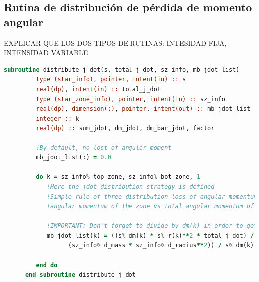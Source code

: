 \subsection{Rutina de distribución de pérdida de momento angular}
EXPLICAR QUE LOS DOS TIPOS DE RUTINAS: INTESIDAD FIJA, INTENSIDAD VARIABLE
\begin{lstlisting}[language=Fortran, caption={Rutina de distribución de pérdida de momento angular.}, label={lst:dis_jdot}]
      subroutine distribute_j_dot(s, total_j_dot, sz_info, mb_jdot_list)
         type (star_info), pointer, intent(in) :: s
         real(dp), intent(in) :: total_j_dot
         type (star_zone_info), pointer, intent(in) :: sz_info
         real(dp), dimension(:), pointer, intent(out) :: mb_jdot_list
         integer :: k
         real(dp) :: sum_jdot, dm_jdot, dm_bar_jdot, factor

         !By default, no lost of angular moment
         mb_jdot_list(:) = 0.0
      
         do k = sz_info% top_zone, sz_info% bot_zone, 1
            !Here the jdot distribution strategy is defined
            !Simple rule of three distribution loss of angular momentum based on the 
            !angular momentum of the zone vs total angular momentum of the convective zone

            !IMPORTANT: Don't forget to divide by dm(k) in order to get an "specific" jdot
            mb_jdot_list(k) = ((s% dm(k) * s% r(k)**2 * total_j_dot) / &
                  (sz_info% d_mass * sz_info% d_radius**2)) / s% dm(k)

         end do
      end subroutine distribute_j_dot

\end{lstlisting}

\endinput

